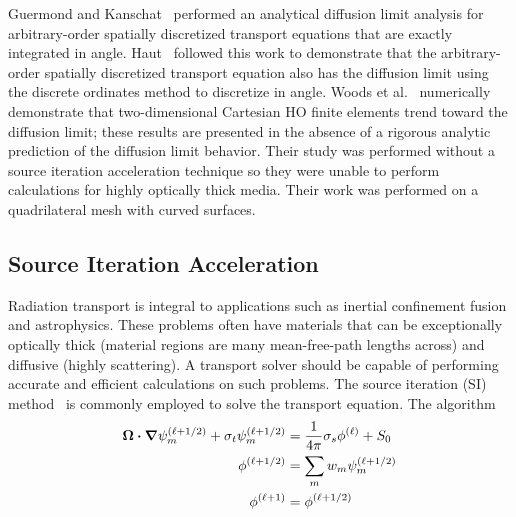 \documentclass[12pt,letterpaper]{article}
\begin{document}
Guermond and Kanschat~\cite{GuermondDiffLimit} performed an analytical diffusion limit analysis for arbitrary-order spatially discretized transport equations that are exactly integrated in angle. Haut~\cite{Haut2018PersonalComm} followed this work to demonstrate that the arbitrary-order spatially discretized transport equation also has the diffusion limit using the discrete ordinates method to discretize in angle. Woods et al.~\cite{WoodsHoDgfemXyCurved} numerically demonstrate that two-dimensional Cartesian HO finite elements trend toward the diffusion limit; these results are presented in the absence of a rigorous analytic prediction of the diffusion limit behavior. Their study was performed without a source iteration acceleration technique so they were unable to perform calculations for highly optically thick media. Their work was performed on a quadrilateral mesh with curved surfaces.


\subsection{Source Iteration Acceleration}
\label{sec:SourceIterationAccelerationIntro}
Radiation transport is integral to applications such as inertial confinement fusion and astrophysics. These problems often have materials that can be exceptionally optically thick (material regions are many mean-free-path lengths across) and diffusive (highly scattering). A transport solver should be capable of performing accurate and efficient calculations on such problems. The source iteration (SI) method~\cite{Lewis_Comp_Methods_Neu_Trans} is commonly employed to solve the transport equation. The algorithm
\begin{subequations}
\begin{flalign}
\bm{\Omega} \bm{\cdot} \bm{\nabla} \psi_m^{(\ell+1/2)} + \sigma_t \psi_m^{(\ell+1/2)} & = \frac{1}{4 \pi} \sigma_s \phi^{(\ell)} + S_0 \label{eq:DSASITransport}\\
\phi^{(\ell+1/2)} & = \sum_m w_m \psi^{(\ell+1/2)}_m \label{eq:DSASIPhiHalf} \\
\phi^{(\ell+1)} & = \phi^{(\ell+1/2)} \label{eq:DSASIUnacceleratedUpdate}
\end{flalign}
\label{eqs:SourceIteration}
\end{subequations}
\end{document}
